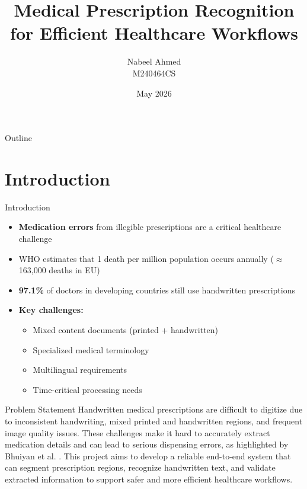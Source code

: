 \documentclass{beamer}
\title{Medical Prescription Recognition for Efficient Healthcare Workflows}
\author{Nabeel Ahmed \\ M240464CS}
\institute{Guided by: Sumesh TA}
\date{May 2026}
\begin{document}
\begin{frame}
\titlepage
\end{frame}

\begin{frame}{Outline}
\tableofcontents
\end{frame}

\section{Introduction}

\begin{frame}{Introduction}
\begin{itemize}
    \item \textbf{Medication errors} from illegible prescriptions are a critical healthcare challenge
    \item WHO estimates that 1 death per million population occurs annually ($\approx$ 163,000 deaths in EU)~\cite{bhuiyan2022online}
    \item \textbf{97.1\%} of doctors in developing countries still use handwritten prescriptions~\cite{bhuiyan2022online}
    \item \textbf{Key challenges:}
    \begin{itemize}
        \item Mixed content documents (printed + handwritten)~\cite{fang2023improved}
        \item Specialized medical terminology~\cite{lee2020biobert}
        \item Multilingual requirements~\cite{pavithiran2024multilingual}
        \item Time-critical processing needs~\cite{irjmets2024}
    \end{itemize}
\end{itemize}
\end{frame}

\begin{frame}{Problem Statement}
Handwritten medical prescriptions are difficult to digitize due to inconsistent handwriting, mixed printed and handwritten regions, and frequent image quality issues. These challenges make it hard to accurately extract medication details and can lead to serious dispensing errors, as highlighted by Bhuiyan et al. \cite{bhuiyan2022online}. This project aims to develop a reliable end-to-end system that can segment prescription regions, recognize handwritten text, and validate extracted information to support safer and more efficient healthcare workflows.
\end{frame}
\end{document}
